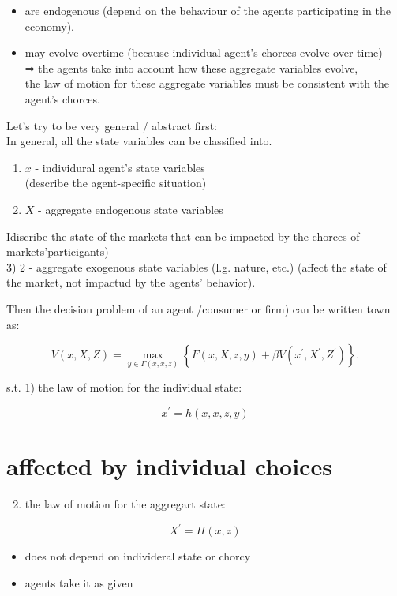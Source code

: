 \documentclass[10pt]{article}
\begin{document}
\begin{itemize}
  \item are endogenous (depend on the behaviour of the agents participating in the economy).
  \item may evolve overtime (because individual agent's chorces evolve over time)\\
⇒ the agents take into account how these aggregate variables evolve,\\
the law of motion for these aggregate variables must be consistent with the agent's chorces.
\end{itemize}

Let's try to be very general / abstract first:\\
In general, all the state variables can be classified into.

\begin{enumerate}
  \item $x$ - individural agent's state variables\\
(describe the agent-specific situation)
  \item $X$ - aggregate endogenous state variables
\end{enumerate}

Idiscribe the state of the markets that can be impacted by the chorces of markets'particigants)\\
3) 2 - aggregate exogenous state variables (l.g. nature, etc.) (affect the state of the market, not impactud by the agents' behavior).

Then the decision problem of an agent /consumer or firm) can be written town as:

$$
V(x, X, Z)=\max _{y \in \Gamma(x, x, z)}\left\{F(x, X, z, y)+\beta V\left(x^{\prime}, X^{\prime}, Z^{\prime}\right)\right\} .
$$

s.t. 1) the law of motion for the individual state:

$$
x^{\prime}=h(x, x, z, y)
$$

\section*{affected by individual choices}
\begin{enumerate}
  \setcounter{enumi}{1}
  \item the law of motion for the aggregart state:
\end{enumerate}

$$
X^{\prime}=H(x, z)
$$

\begin{itemize}
  \item does not depend on individeral state or chorcy
  \item agents take it as given
\end{itemize}
\end{document}
